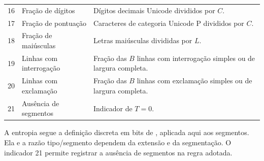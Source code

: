 \begin{longtable}{rP{.31\linewidth}P{.56\linewidth}}
16 & Fração de dígitos & Dígitos decimais Unicode divididos por $C$.\\
17 & Fração de pontuação & Caracteres de categoria Unicode P divididos por $C$.\\
18 & Fração de maiúsculas & Letras maiúsculas divididas por $L$.\\
19 & Linhas com interrogação & Fração das $B$ linhas com interrogação simples ou de largura completa.\\
20 & Linhas com exclamação & Fração das $B$ linhas com exclamação simples ou de largura completa.\\
21 & Ausência de segmentos & Indicador de $T=0$.\\
\end{longtable}
\endgroup

A entropia segue a definição discreta em bits de , aplicada aqui aos segmentos. Ela e a razão tipo/segmento dependem da extensão e da segmentação. O indicador 21 permite registrar a ausência de segmentos na regra adotada.
